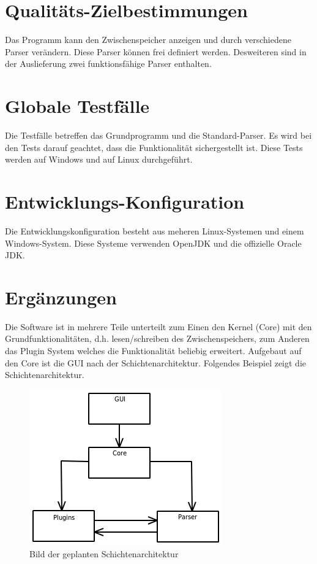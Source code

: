 \documentclass[a4paper,11pt,abstracton,titlepage]{scrartcl}
\begin{document}
\section{Qualitäts-Zielbestimmungen}
Das Programm kann den Zwischenspeicher anzeigen und durch verschiedene Parser
verändern. Diese Parser können frei definiert werden. Desweiteren sind in der
Auslieferung zwei funktionsfähige Parser enthalten.

\section{Globale Testfälle} 
Die Testfälle betreffen das Grundprogramm und die Standard-Parser.  Es wird bei
den Tests darauf geachtet, dass die Funktionalität sichergestellt ist.  Diese
Tests werden auf Windows und auf Linux durchgeführt.


\section{Entwicklungs-Konfiguration}
Die Entwicklungskonfiguration besteht aus meheren Linux-Systemen und einem
Windows-System. Diese Systeme verwenden OpenJDK und die offizielle Oracle  JDK.

\section{Ergänzungen}
Die Software ist in mehrere Teile unterteilt zum Einen den Kernel (Core) mit den
Grundfunktionalitäten, d.h. lesen/schreiben des Zwischenspeichers, zum Anderen
das Plugin System welches die Funktionalität beliebig erweitert. Aufgebaut auf
den Core ist die GUI nach der Schichtenarchitektur. Folgendes Beispiel zeigt die
Schichtenarchitektur.
\newline \begin{figure}[htbp]
\centering
\includegraphics[scale=0.7]{Schichtenarchitektur} 
\caption{Bild der geplanten Schichtenarchitektur} 
\end{figure} 
\newpage 
\end{document}
